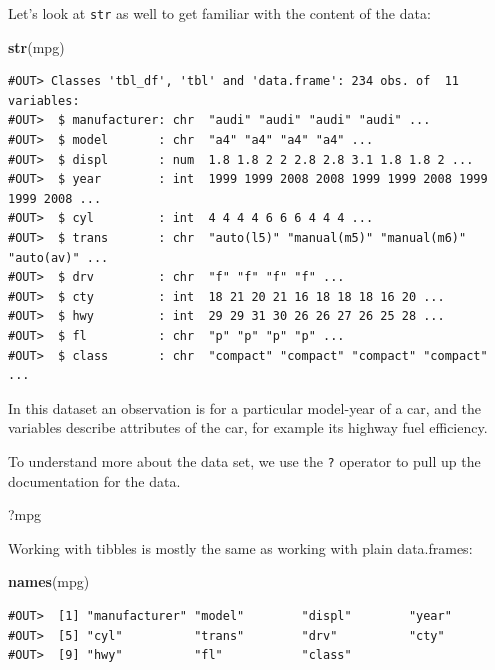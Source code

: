 \documentclass[]{book}
\newenvironment{Shaded}{\begin{snugshade}}{\end{snugshade}}
\newcommand{\KeywordTok}[1]{\textcolor[rgb]{0.13,0.29,0.53}{\textbf{#1}}}
\newcommand{\NormalTok}[1]{#1}
\theoremstyle{definition}
\theoremstyle{definition}
\theoremstyle{definition}
\theoremstyle{remark}
\begin{document}
Let's look at \texttt{str} as well to get familiar with the content of
the data:

\begin{Shaded}
\begin{Highlighting}[]
\KeywordTok{str}\NormalTok{(mpg)}
\end{Highlighting}
\end{Shaded}

\begin{verbatim}
#OUT> Classes 'tbl_df', 'tbl' and 'data.frame': 234 obs. of  11 variables:
#OUT>  $ manufacturer: chr  "audi" "audi" "audi" "audi" ...
#OUT>  $ model       : chr  "a4" "a4" "a4" "a4" ...
#OUT>  $ displ       : num  1.8 1.8 2 2 2.8 2.8 3.1 1.8 1.8 2 ...
#OUT>  $ year        : int  1999 1999 2008 2008 1999 1999 2008 1999 1999 2008 ...
#OUT>  $ cyl         : int  4 4 4 4 6 6 6 4 4 4 ...
#OUT>  $ trans       : chr  "auto(l5)" "manual(m5)" "manual(m6)" "auto(av)" ...
#OUT>  $ drv         : chr  "f" "f" "f" "f" ...
#OUT>  $ cty         : int  18 21 20 21 16 18 18 18 16 20 ...
#OUT>  $ hwy         : int  29 29 31 30 26 26 27 26 25 28 ...
#OUT>  $ fl          : chr  "p" "p" "p" "p" ...
#OUT>  $ class       : chr  "compact" "compact" "compact" "compact" ...
\end{verbatim}

In this dataset an observation is for a particular model-year of a car,
and the variables describe attributes of the car, for example its
highway fuel efficiency.

To understand more about the data set, we use the \texttt{?} operator to
pull up the documentation for the data.

\begin{Shaded}
\begin{Highlighting}[]
\NormalTok{?mpg}
\end{Highlighting}
\end{Shaded}

Working with tibbles is mostly the same as working with plain
data.frames:

\begin{Shaded}
\begin{Highlighting}[]
\KeywordTok{names}\NormalTok{(mpg)}
\end{Highlighting}
\end{Shaded}

\begin{verbatim}
#OUT>  [1] "manufacturer" "model"        "displ"        "year"        
#OUT>  [5] "cyl"          "trans"        "drv"          "cty"         
#OUT>  [9] "hwy"          "fl"           "class"
\end{verbatim}
\end{document}
